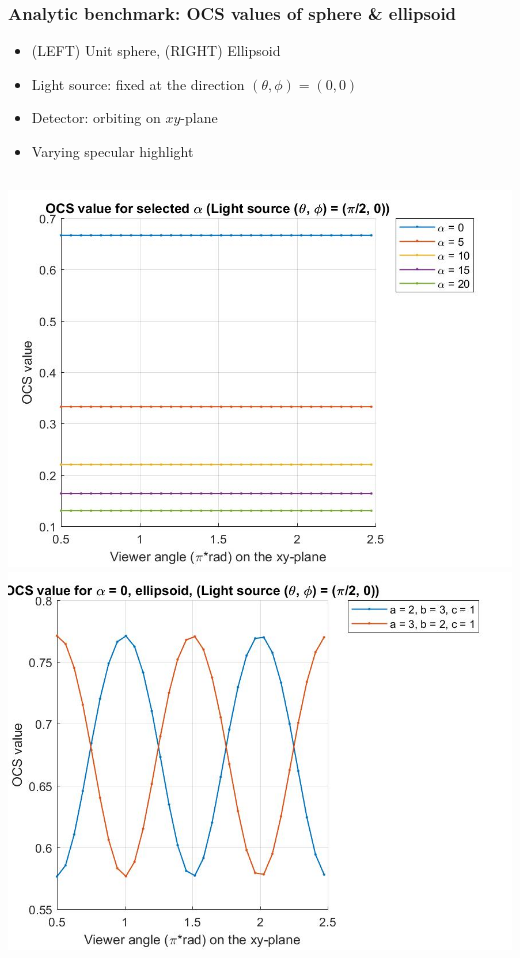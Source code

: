 \documentclass{beamer}
\begin{document}
\begin{frame}[t]
\frametitle{Analytic benchmark: OCS values of sphere \& ellipsoid}
\begin{itemize}
\item (LEFT) Unit sphere, (RIGHT) Ellipsoid
\item Light source: fixed at the direction $(\theta,\phi) = (0,0)$
\item Detector: orbiting on $xy$-plane
\item Varying specular highlight
\end{itemize}
\begin{columns}[c]
\centering \includegraphics[scale=0.22]{./figs/OCS_perpendicular_plane}
\centering \includegraphics[scale=0.13]{./figs/OCS_perpendicular_plane_ellipsoid}
\end{columns}
\end{frame}
\end{document}
